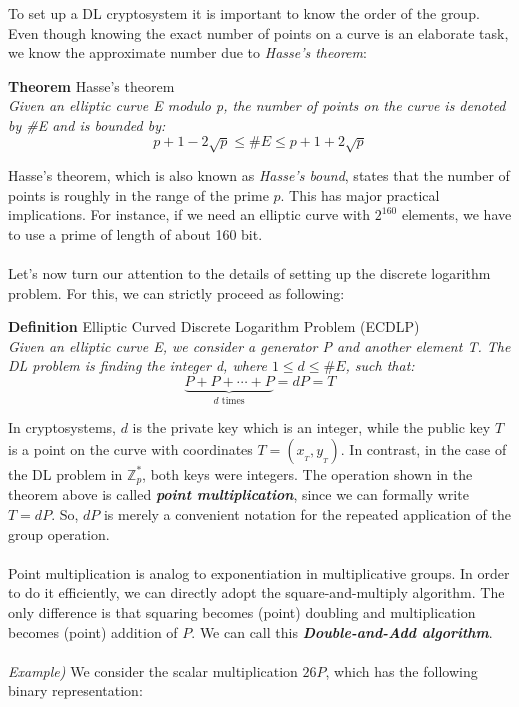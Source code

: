 \newpage
\hfill\break
To set up a DL cryptosystem it is important to know the order of the group. Even though knowing the exact number of points on a curve is an elaborate task, we know the approximate number due to \textit{Hasse's theorem}:
\begin{framed}
    \hfill\break\textbf{Theorem} Hasse's theorem\\
    \textit{Given an elliptic curve E modulo p, the number of points on the curve is denoted by \#E and is bounded \nolinebreak by:}
    $$p+1-2\sqrt{p}\le\#E\le p+1+2\sqrt{p}$$
\end{framed}
Hasse's theorem, which is also known as \textit{Hasse's bound}, states that the number of points is roughly in the range of the prime $p$. This has major practical implications. For instance, if we need an elliptic curve with $2^{160}$ elements, we have to use a prime of length of about 160 bit.\\\\
Let's now turn our attention to the details of setting up the discrete logarithm problem. For this, we can strictly proceed as following:
\begin{framed}
    \hfill\break\textbf{Definition} Elliptic Curved Discrete Logarithm Problem (ECDLP)\\
    \textit{Given an elliptic curve E, we consider a generator P and another element T. The DL problem is finding the integer d, where $1\le d\le\#E$, such that:}
    $$\underbrace{P+P+\cdots+P}_{d\text{ times}}=dP=T$$
\end{framed}
In cryptosystems, $d$ is the private key which is an integer, while the public key $T$ is a point on the curve with coordinates $T=(x_{_T},y_{_T})$. In contrast, in the case of the DL problem in $\mathbb{Z}_p^*$, both keys were integers. The operation shown in the theorem above is called \textit{\textbf{point multiplication}}, since we can formally write $T=dP$. So, $dP$ is merely a convenient notation for the repeated application of the group operation.\\\\
Point multiplication is analog to exponentiation in multiplicative groups. In order to do it efficiently, we can directly adopt the square-and-multiply algorithm. The only difference is that squaring becomes (point) doubling and multiplication becomes (point) addition of $P$. We can call this \textbf{\textit{Double-and-Add algorithm}}.\\\\
\textit{Example)} We consider the scalar multiplication $26P$, which has the following binary representation:
